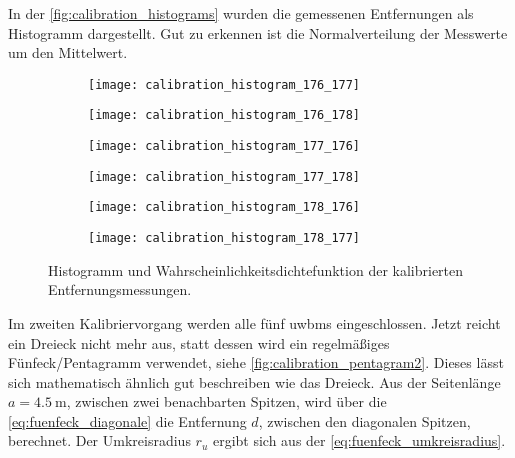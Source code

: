 
In der \autoref{fig:calibration_histograms} wurden die gemessenen Entfernungen als Histogramm dargestellt. Gut zu erkennen ist die Normalverteilung der Messwerte um den Mittelwert.

\begin{figure}[h]
	\centering
	\begin{subfigure}[b]{0.32\linewidth}
		\centering
		\texttt{[image: calibration\_histogram\_176\_177]}
	\end{subfigure}
	\hfill
	\begin{subfigure}[b]{0.32\linewidth}
		\centering
		\texttt{[image: calibration\_histogram\_176\_178]}
	\end{subfigure}
	\hfill
	\begin{subfigure}[b]{0.32\linewidth}
		\centering
		\texttt{[image: calibration\_histogram\_177\_176]}
	\end{subfigure}
	\par
	\bigskip
	\begin{subfigure}[b]{0.32\linewidth}
		\centering
		\texttt{[image: calibration\_histogram\_177\_178]}
	\end{subfigure}
	\hfill
	\begin{subfigure}[b]{0.32\linewidth}
		\centering
		\texttt{[image: calibration\_histogram\_178\_176]}
	\end{subfigure}
	\hfill
	\begin{subfigure}[b]{0.32\linewidth}
		\centering
		\texttt{[image: calibration\_histogram\_178\_177]}
	\end{subfigure}
	\caption{Histogramm und Wahrscheinlichkeitsdichtefunktion der kalibrierten Entfernungsmessungen.}
	\label{fig:calibration_histograms}
\end{figure}

Im zweiten Kalibriervorgang werden alle fünf \Glspl{uwbm} eingeschlossen. Jetzt reicht ein Dreieck nicht mehr aus, statt dessen wird ein regelmäßiges Fünfeck/Pentagramm verwendet, siehe \autoref{fig:calibration_pentagram2}. Dieses lässt sich mathematisch ähnlich gut beschreiben wie das Dreieck. Aus der Seitenlänge $a = \SI{4.5}{\meter}$, zwischen zwei benachbarten Spitzen, wird über die \autoref{eq:fuenfeck_diagonale} die Entfernung $d$, zwischen den diagonalen Spitzen, berechnet. Der Umkreisradius $r_u$ ergibt sich aus der \autoref{eq:fuenfeck_umkreisradius}.

